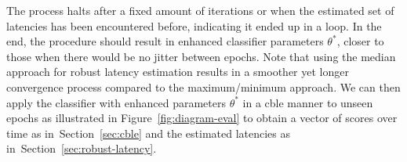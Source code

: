 The process halts after a fixed amount of iterations or when the estimated set
of latencies has been encountered before, indicating it ended up in a loop.
In the end, the procedure should result in enhanced classifier parameters $\theta^*$,
closer to those when there would be no jitter between epochs.
Note that using the median approach for robust latency estimation results in a
smoother yet longer convergence process compared to the maximum/minimum approach.
We can then apply the classifier with enhanced parameters $\theta^*$ in a \ac{cble}
manner to unseen epochs as illustrated in Figure~\ref{fig:diagram-eval} to obtain a
vector of scores over time as in~Section~\ref{sec:cble} and the estimated latencies as
in~Section~\ref{sec:robust-latency}.

